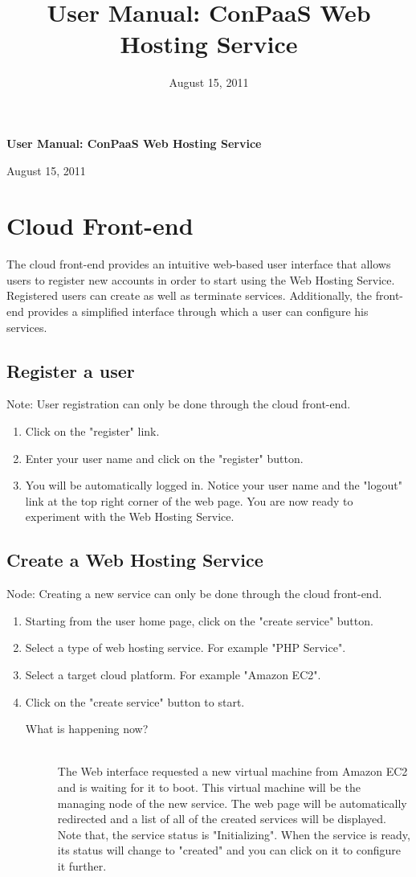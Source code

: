 \documentclass[10pt]{article}
\newenvironment{what}
{\begin{description} \item [What is happening now?] \hfill \\}
{\end{description}}
\begin{document}
\title{User Manual: ConPaaS Web Hosting Service}
\date{August 15, 2011}
\thispagestyle{empty}

\begin{center}
\begingroup
\fontsize{20pt}{20pt}\selectfont
\textbf{User Manual: ConPaaS Web Hosting Service} \linebreak
\endgroup

\begingroup
\fontsize{16pt}{16pt}\selectfont
August 15, 2011
\endgroup
\end{center}

\section{Cloud Front-end}
The cloud front-end provides an intuitive web-based user interface that
allows users to register new accounts in order to start using the Web
Hosting Service. Registered users can create as well as terminate
services. Additionally, the front-end provides a simplified interface
through which a user can configure his services.

\subsection{Register a user}
Note: User registration can only be done through the cloud front-end.
\begin{enumerate}
\item Click on the "register" link.
\item Enter your user name and click on the "register" button.
\item You will be automatically logged in. Notice your user name and the "logout"
      link at the top right corner of the web page. You are now ready to
      experiment with the Web Hosting Service.
\end{enumerate}

\subsection{Create a Web Hosting Service}
Node: Creating a new service can only be done through the cloud front-end. 
\begin{enumerate}
\item Starting from the user home page, click on the "create service" button.
\item Select a type of web hosting service. For example "PHP Service".
\item Select a target cloud platform. For example "Amazon EC2".
\item Click on the "create service" button to start.
 \begin{what}
  The Web interface requested a new virtual machine from Amazon EC2 and
  is waiting for it to boot. This virtual machine will be the managing
  node of the new service. The web page will be automatically redirected
  and a list of all of the created services will be displayed.
  Note that, the service status is "Initializing". When the service is
  ready, its status will change to "created" and you can click on it to
  configure it further.
 \end{what}
\end{enumerate}
\end{document}
